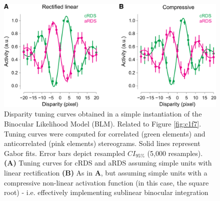 \begin{figure}[!h]
  \centering
  \includegraphics{FigS7.png}
  \caption[Disparity tuning curves in the Binocular Likelihood Model.]{Disparity tuning curves obtained in a simple instantiation of the Binocular Likelihood Model (BLM). Related to Figure \ref{fig:c1f7}. Tuning curves were computed for correlated (green elements) and anticorrelated (pink elements) stereograms. Solid lines represent Gabor fits. Error bars depict resampled $CI_{95\%}$ (5,000 resamples). \textbf{(A)} Tuning curves for cRDS and aRDS assuming simple units with linear rectification \textbf{(B)} As in \textbf{A}, but assuming simple units with a compressive non-linear activation function (in this case, the square root) - i.e. effectively implementing sublinear binocular integration \cite{Longordo2013}}
  \label{fig:c1fs7}
\end{figure}



